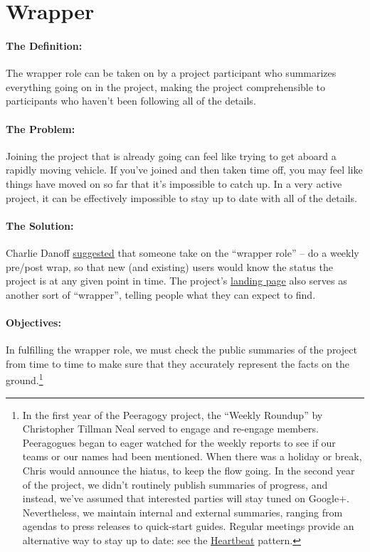 \section{Wrapper}
\paragraph{The Definition:} The wrapper role can be taken on by a project
participant who summarizes everything going on in the project, making
the project comprehensible to participants who haven't been following
all of the details.

\paragraph{The Problem:} Joining the project that is already going can feel
like trying to get aboard a rapidly moving vehicle. If you've joined and
then taken time off, you may feel like things have moved on so far that
it's impossible to catch up. In a very active project, it can be
effectively impossible to stay up to date with all of the details.

\paragraph{The Solution:} Charlie
Danoff \href{http://socialmediaclassroom.com/host/peeragogy/wiki/rolesdivision-labor}{suggested}
that someone take on the ``wrapper role'' -- do a weekly pre/post wrap,
so that new (and existing) users would know the status the project is at
any given point in time. The
project's \href{http://socialmediaclassroom.com/host/peeragogy/}{landing
page} also serves as another sort of ``wrapper'', telling people what
they can expect to find.

\paragraph{Objectives:} In fulfilling the wrapper role, we must check the
public summaries of the project from time to time to make sure that they
accurately represent the facts on the ground.\footnote{In the first year of the Peeragogy project, the
``Weekly Roundup'' by Christopher Tillman Neal served to engage and
re-engage members. Peeragogues began to eager watched for the weekly
reports to see if our teams or our names had been mentioned. When there
was a holiday or break, Chris would announce the hiatus, to keep the
flow going. In the second year of the project, we didn't routinely
publish summaries of progress, and instead, we've assumed that
interested parties will stay tuned on Google+. Nevertheless, we maintain
internal and external summaries, ranging from agendas to press releases
to quick-start guides. Regular meetings provide an alternative way to
stay up to date: see
the \href{http://peeragogy.org/patterns/heartbeat/}{Heartbeat} pattern.}

